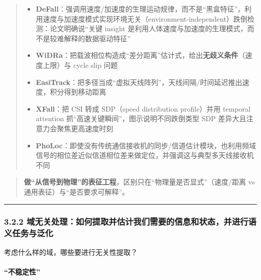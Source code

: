 \documentclass[
]{article}
\begin{document}
\begin{quote}
\begin{itemize}
\item
  \textbf{DeFall}：强调用速度/加速度的生理运动规律，而不是``黑盒特征''，利用速度与加速度模式实现环境无关（environment-independent）跌倒检测：论文明确说``关键
  insight
  是利用人体速度与加速度的生理模式，而不是较难解释的数据驱动特征''
\item
  \textbf{WiDRa}：把载波相位构造成``差分距离''估计式，给出\textbf{无歧义条件}（速度上限）与
  cycle slip 问题
\item
  \textbf{EasiTrack}：把多径当成``虚拟天线阵列''，天线间隔/时间延迟推出速度，积分得到移动距离
\item
  \textbf{XFall}：把 CSI 转成 SDP（speed distribution profile）并用
  temporal attention 抓``高速关键瞬间''，图示说明不同跌倒类型 SDP
  差异大且注意力会聚焦更高速度时刻
\item
  \textbf{PhoLoc}：即使没有传统通信接收机的同步/信道估计模块，也利用频域信号的相位差近似信道相位差来做定位，并强调这与典型多天线接收机不同
\end{itemize}
\end{quote}

\begin{quote}
\textbf{做``从信号到物理''的表征工程}，区别只在``物理量是否显式''（速度/距离
vs 通用表征）与``是否要求可解释''。
\end{quote}

\begin{center}\rule{0.5\linewidth}{0.5pt}\end{center}

\subsubsection{3.2.2
域无关处理：如何提取并估计我们需要的信息和状态，并进行语义任务与泛化}\label{322-ux57dfux65e0ux5173ux5904ux7406ux5982ux4f55ux63d0ux53d6ux5e76ux4f30ux8ba1ux6211ux4eecux9700ux8981ux7684ux4fe1ux606fux548cux72b6ux6001ux5e76ux8fdbux884cux8bedux4e49ux4efbux52a1ux4e0eux6cdbux5316}

考虑什么样的域，哪些要进行无关性提取？

\paragraph{``不稳定性''}\label{ux4e0dux7a33ux5b9aux6027}
\end{document}
